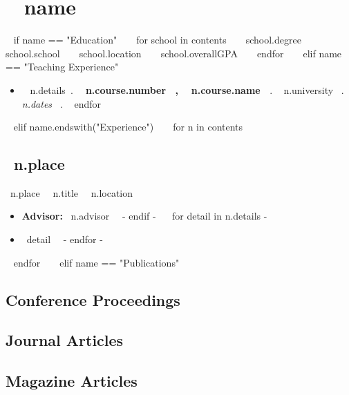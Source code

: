 \section{ ~{{ name }}~ }

~{ if name == "Education" }~
  ~{ for school in contents }~
      {~{{ school.degree }}~}%
      {~{{ school.school }}~}%
      {~{{ school.location }}~}%
      {~{{ school.overallGPA }}~}%
      {}
  ~{ endfor }~
~{ elif name == "Teaching Experience" }~
  \begin{itemize}
    ~{ for n in contents }~
      \item
        ~{{ n.details}}~.
        {\bf ~{{ n.course.number }}~, ~{{ n.course.name }}~}.
        ~{{ n.university }}~.
        {\it ~{{ n.dates }}~}.
    ~{ endfor }~
  \end{itemize}
~{ elif name.endswith("Experience") }~
  ~{ for n in contents }~
    \subsection{~{{n.place}}~}
      {~{{n.place}}~}%
      {~{{n.title}}~}%
      {~{{n.location}}~}%
      {}%
      {
        \begin{itemize}
        ~{ if n.advisor -}~
          \item {\bf Advisor:} ~{{n.advisor}}~
        ~{- endif -}~
        ~{ for detail in n.details -}~
          \item ~{{detail}}~
        ~{- endfor -}~
        \end{itemize}
      }
  ~{ endfor }~
~{ elif name == "Publications" }~
  \nocite{*}

  \renewcommand*{\bibfont}{\small}
  \subsection{Conference Proceedings}
  \printbibliography[heading=none,type=inproceedings,prefixnumbers=C]

  \subsection{Journal Articles}
  \printbibliography[heading=none,type=article,keyword=journal,
    resetnumbers=true,prefixnumbers=J]

  \subsection{Magazine Articles}
  \printbibliography[heading=none,type=article,keyword=magazine,
    resetnumbers=true,prefixnumbers=M]

